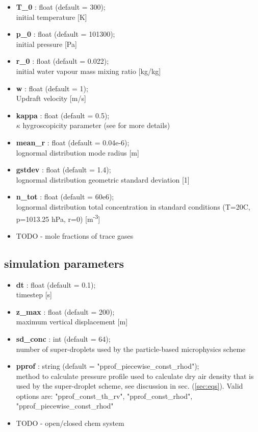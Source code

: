 \documentclass[11pt]{article}
\begin{document}
\begin{itemize}

  \item \textbf{T\_0} : float (default = 300);\\ initial temperature [K]
  \item \textbf{p\_0} : float (default = 101300);\\ initial pressure [Pa]
  \item \textbf{r\_0} : float (default = 0.022);\\ initial water vapour mass mixing ratio [kg/kg]
  \item \textbf{w} : float (default = 1);\\ Updraft velocity [m/s]
  \item \textbf{kappa} : float (default = 0.5);\\ $\kappa$ hygroscopicity parameter (see \citep{Petters_et_al_2007} for more details)
  \item \textbf{mean\_r} : float (default = 0.04e-6);\\ lognormal distribution mode radius [m]
  \item \textbf{gstdev} : float (default = 1.4);\\ lognormal distribution geometric standard deviation [1]
  \item \textbf{n\_tot} : float (default = 60e6);\\ lognormal distribution total concentration in standard conditions 
                               (T=20C, p=1013.25 hPa, r=0) [m\textsuperscript{-3}]
  \item{TODO - mole fractions of trace gases}

\end{itemize}

\subsection{simulation parameters}

\begin{itemize}

  \item \textbf{dt} : float (default = 0.1); \\ timestep [s]
  \item \textbf{z\_max} : float (default = 200); \\ maximum vertical displacement [m]
  \item \textbf{sd\_conc} : int (default = 64); \\ number of super-droplets used by the particle-based microphysics scheme
  \item \textbf{pprof} : string (default = "pprof\_piecewise\_const\_rhod"); \\ 
                method to calculate pressure profile used to calculate 
                dry air density that is used by the super-droplet scheme, see discussion in sec. (\ref{sec:eqs}). 
                Valid options are: "pprof\_const\_th\_rv", "pprof\_const\_rhod", "pprof\_piecewise\_const\_rhod"
  \item TODO - open/closed chem system
\end{itemize}
\end{document}
